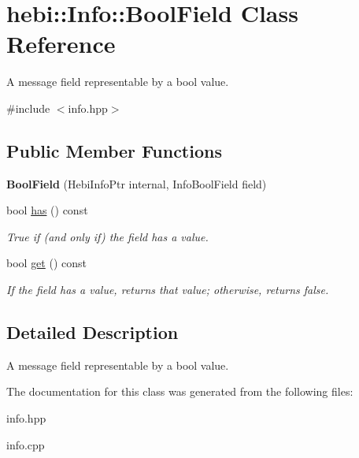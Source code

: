 \hypertarget{classhebi_1_1Info_1_1BoolField}{}\section{hebi\+:\+:Info\+:\+:Bool\+Field Class Reference}
\label{classhebi_1_1Info_1_1BoolField}


A message field representable by a bool value.  




{\ttfamily \#include $<$info.\+hpp$>$}

\subsection*{Public Member Functions}
\begin{DoxyCompactItemize}
\item 
\mbox{\label{classhebi_1_1Info_1_1BoolField_ae4a42c5663dbaced0bfebd056cec2b78}} 
{\bfseries Bool\+Field} (Hebi\+Info\+Ptr internal, Info\+Bool\+Field field)
\item 
\mbox{\label{classhebi_1_1Info_1_1BoolField_adbd17c64566fdea944cd6f8f9bd62125}} 
bool \hyperlink{classhebi_1_1Info_1_1BoolField_adbd17c64566fdea944cd6f8f9bd62125}{has} () const
\begin{DoxyCompactList}\small\item\em True if (and only if) the field has a value. \end{DoxyCompactList}\item 
\mbox{\label{classhebi_1_1Info_1_1BoolField_aa043b054214f4888594ca0cf3a397f45}} 
bool \hyperlink{classhebi_1_1Info_1_1BoolField_aa043b054214f4888594ca0cf3a397f45}{get} () const
\begin{DoxyCompactList}\small\item\em If the field has a value, returns that value; otherwise, returns false. \end{DoxyCompactList}\end{DoxyCompactItemize}


\subsection{Detailed Description}
A message field representable by a bool value. 

The documentation for this class was generated from the following files\+:\begin{DoxyCompactItemize}
\item 
info.\+hpp\item 
info.\+cpp\end{DoxyCompactItemize}
